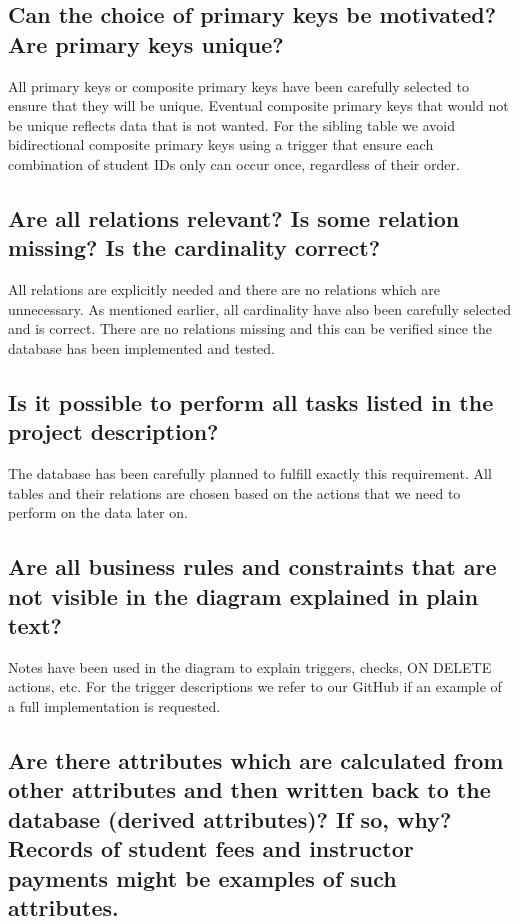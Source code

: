 \documentclass[a4paper]{scrartcl}
\begin{document}
\subsection{Can the choice of primary keys be motivated? Are primary keys unique?} All primary keys or composite primary keys have been carefully selected to ensure that they will be unique. Eventual composite primary keys that would not be unique reflects data that is not wanted. For the sibling table we avoid bidirectional composite primary keys using a trigger that ensure each combination of student IDs only can occur once, regardless of their order.


\subsection{Are all relations relevant? Is some relation missing? Is the cardinality correct?}
All relations are explicitly needed and there are no relations which are unnecessary. As mentioned earlier, all cardinality have also been carefully selected and is correct. There are no relations missing and this can be verified since the database has been implemented and tested.

\subsection{Is it possible to perform all tasks listed in the project description?}
The database has been carefully planned to fulfill exactly this requirement. All tables and their relations are chosen based on the actions that we need to perform on the data later on.

\subsection{Are all business rules and constraints that are not visible in the diagram explained in plain text?}
Notes have been used in the diagram to explain triggers, checks, ON DELETE actions, etc. For the trigger descriptions we refer to our GitHub if an example of a full implementation is requested.

\subsection{Are there attributes which are calculated from other attributes and then written back to the database (derived attributes)? If so, why? Records of student fees and instructor payments might be examples of such attributes.}
\end{document}
